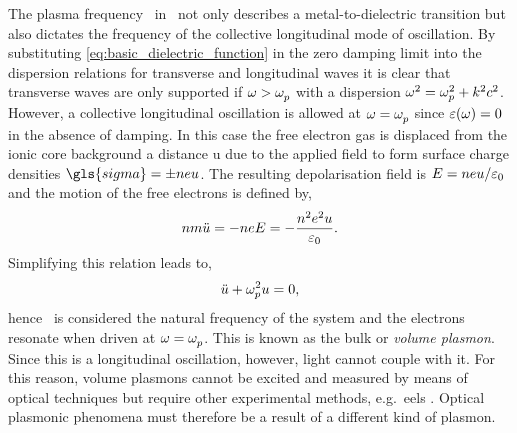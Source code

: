 \documentclass{article}
\begin{document}

The plasma frequency \omegap\ in \dielectric\ not only describes a metal-to-dielectric transition but also dictates the frequency of the collective longitudinal mode of oscillation. By substituting \eqref{eq:basic_dielectric_function} in the zero damping limit into the dispersion relations for transverse and longitudinal waves it is clear that transverse waves are only supported if $\omega>\omegap$ with a dispersion $\omega^2=\omegap[2]+\wvm^2c^2$. However, a collective longitudinal oscillation is allowed at $\omega=\omegap$ since $\dielectric=0$ in the absence of damping. In this case the free electron gas is displaced from the ionic core background a distance \gls{u} due to the applied field to form surface charge densities $\gls{sigma} = \pm neu$. The resulting depolarisation field
is $E = neu/\epsfs$ and the motion of the free electrons is defined by,
\begin{equation}
	nm\ddot{u} = -neE = -\frac{n^2e^2u}{\epsfs}.
\end{equation}
Simplifying this relation leads to,
\begin{equation}
	\ddot{u}+\omegap[2] u=0,
\end{equation}
hence \omegap\ is considered the natural frequency of the system and the electrons resonate when driven at $\omega=\omegap$. This is known as the bulk or \emph{volume plasmon}. Since this is a longitudinal oscillation, however, light cannot couple with it. For this reason, volume plasmons cannot be excited and measured by means of optical techniques but require other experimental methods, e.g.\ \gls{eels} \cite{egerton2011electron}. Optical plasmonic phenomena must therefore be a result of a different kind of plasmon.
\end{document}
